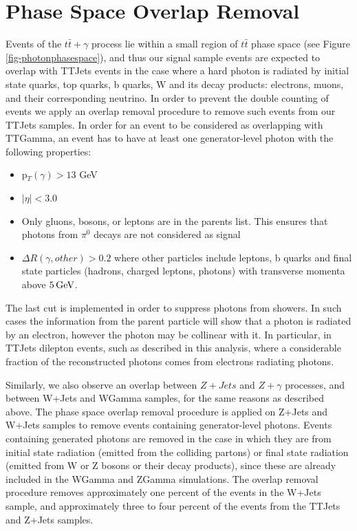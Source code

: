 \section{Phase Space Overlap Removal} \label{sec-PhaseSpaceOverlapRemoval}

Events of the $t\bar{t}+\gamma$ process lie within a small region of $t\bar{t}$ phase space (see Figure \ref{fig-photonphasespace}), and thus our signal sample events are expected to overlap with TTJets events in the case where a hard photon is radiated by initial state quarks, top quarks, b quarks, W and its decay products: electrons, muons, and their corresponding neutrino. In order to prevent the double counting of events we apply an overlap removal procedure to remove such events from our TTJets samples. In order for an event to be considered as overlapping with TTGamma, an event has to have at least one generator-level photon with the following properties:

\begin{itemize}
	\item p$_T(\gamma) > 13$ GeV
	\item $|\eta| < 3.0$
	\item Only gluons, bosons, or leptons are in the parents list. This ensures that photons from $\pi^0$ decays are not considered as signal
	\item $\Delta R(\gamma, other) > 0.2$ where other particles include leptons, b quarks and final state particles (hadrons, charged leptons, photons) with transverse momenta above $5 \,\text{Ge\hspace{-.08em}V}$.
\end{itemize}

The last cut is implemented in order to suppress photons from showers. In such cases the information from the parent particle will show that a photon is radiated by an electron, however the photon may be collinear with it. In particular, in TTJets dilepton events, such as described in this analysis, where a considerable fraction of the reconstructed photons comes from electrons radiating photons.

 Similarly, we also observe an overlap between $Z+Jets$ and $Z+\gamma$ processes, and between W+Jets and WGamma samples, for the same reasons as described above. The phase space overlap removal procedure is applied on Z+Jets and W+Jets samples to remove events containing generator-level photons. Events containing generated photons are removed in the case in which they are from initial state radiation (emitted from the colliding partons) or final state radiation (emitted from W or Z bosons or their decay products), since these are already included in the WGamma and ZGamma simulations. The overlap removal procedure removes approximately one percent of the events in the W+Jets sample, and approximately three to four percent of the events from the TTJets and Z+Jets samples.

